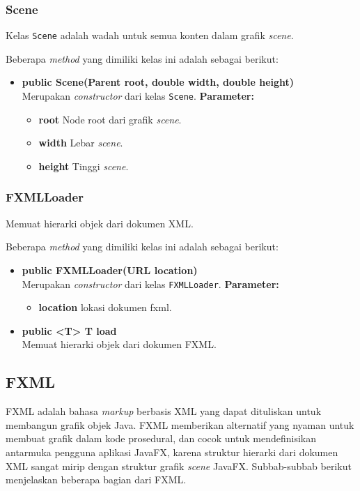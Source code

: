 \subsubsection{Scene}
Kelas \texttt{Scene} adalah wadah untuk semua konten dalam grafik \textit{scene}. 

Beberapa \textit{method} yang dimiliki kelas ini adalah sebagai berikut:
\begin{itemize}
	\item \textbf{public Scene(Parent root, double width, double height)}\\
    Merupakan \textit{constructor} dari kelas \texttt{Scene}.
    \textbf{Parameter:}
	\begin{itemize}
		\item \textbf{root} Node root dari grafik \textit{scene}.
		\item \textbf{width} Lebar \textit{scene}.
		\item \textbf{height} Tinggi \textit{scene}.
	\end{itemize}
\end{itemize}


\subsubsection{FXMLLoader}
Memuat hierarki objek dari dokumen XML.

Beberapa \textit{method} yang dimiliki kelas ini adalah sebagai berikut:
\begin{itemize}
	\item \textbf{public FXMLLoader(URL location)}\\
    Merupakan \textit{constructor} dari kelas \texttt{FXMLLoader}.
	\textbf{Parameter:}
	\begin{itemize}
		\item \textbf{location} lokasi dokumen fxml.
	\end{itemize}
	
	\item \textbf{public <T> T load}\\
	Memuat hierarki objek dari dokumen FXML.
\end{itemize}

\subsection{FXML}
FXML adalah bahasa \textit{markup} berbasis XML yang dapat dituliskan untuk membangun grafik objek Java. FXML memberikan alternatif yang nyaman untuk membuat grafik dalam kode prosedural, dan cocok untuk mendefinisikan antarmuka pengguna aplikasi JavaFX, karena struktur hierarki dari dokumen XML sangat mirip dengan struktur grafik \textit{scene} JavaFX. \cite{javafx} Subbab-subbab berikut menjelaskan beberapa bagian dari FXML.


